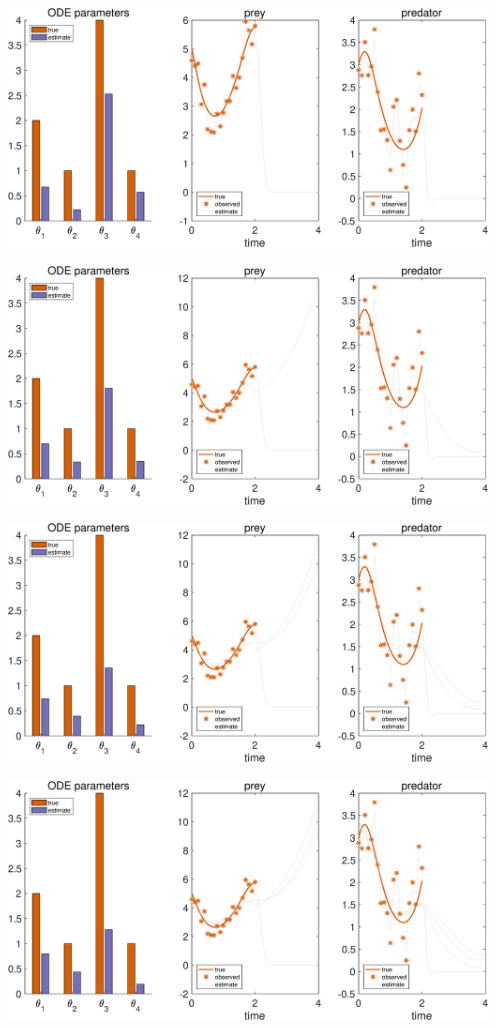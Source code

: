 {\centering
\includegraphics [width=5in]{Lotka_Volterra_3_05.eps}

\includegraphics [width=5in]{Lotka_Volterra_3_06.eps}

\includegraphics [width=5in]{Lotka_Volterra_3_07.eps}

\includegraphics [width=5in]{Lotka_Volterra_3_08.eps}

}

